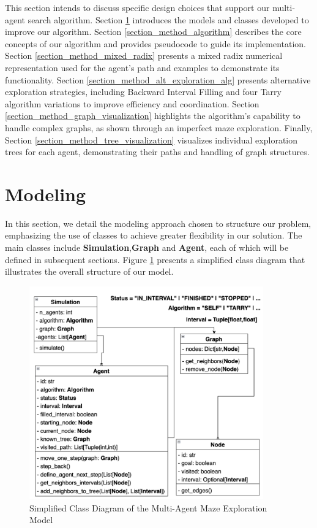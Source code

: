 This section intends to discuss specific design choices that support
our multi-agent search algorithm.
Section \ref{section_method_modeling} introduces the models and classes developed to improve our algorithm.
Section \ref{section_method_algorithm} describes the core concepts of our algorithm and provides pseudocode to guide its implementation.
Section \ref{section_method_mixed_radix} presents a mixed radix numerical representation used for the agent's path and examples to demonstrate its functionality.
Section \ref{section_method_alt_exploration_alg} presents alternative exploration strategies, including Backward Interval Filling and four Tarry algorithm variations to improve efficiency and coordination.
Section \ref{section_method_graph_visualization} highlights the algorithm's capability to handle complex graphs, as shown through an imperfect maze exploration.
Finally, Section \ref{section_method_tree_visualization} visualizes individual exploration trees for each agent, demonstrating their paths and handling of graph structures.

\section{Modeling}
\label{section_method_modeling}

In this section, we detail the modeling approach chosen to structure our problem,
emphasizing the use of classes to achieve greater flexibility in our solution.
The main classes include \textbf{Simulation},\textbf{Graph} and \textbf{Agent}, each of which will be defined in subsequent sections.
Figure \ref{fig:class_diagram} presents a simplified class diagram that illustrates the overall structure of our model.

\begin{figure}[ht!]
    \centering
    \includegraphics[width=0.9\textwidth]{Cap2/simplified_class_diagram.png}
    \caption{Simplified Class Diagram of the Multi-Agent Maze Exploration Model}
    \label{fig:class_diagram}
\end{figure}

